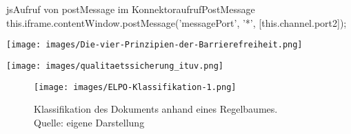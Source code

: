 \begin{table}[!ht]
    \centering
    \caption{Bewertung der Bedrohungen}
    \label{schaden+wahrscheinlichkeitTabelle}
\end{table}



\begin{codeBlock}{js}{Aufruf von postMessage im Konnektor}{aufrufPostMessage}
    this.iframe.contentWindow.postMessage('messagePort', '*', [this.channel.port2]); 
\end{codeBlock}

\begin{center}
\captionsetup{type=figure}
\texttt{[image: images/Die-vier-Prinzipien-der-Barrierefreiheit.png]}
\label{BF-Prinzipien-Bild}
\end{center}

\begin{center}
\captionsetup{type=figure}
\texttt{[image: images/qualitaetssicherung\_ituv.png]}
\label{qualitaetssicherung_ituv}
\end{center}
\begin{figure}
    \centering
    \texttt{[image: images/ELPO-Klassifikation-1.png]}
    \caption{Klassifikation des Dokuments anhand eines Regelbaumes. \protect\\Quelle: eigene Darstellung} %
    \label{fig:ELPO-Klassifikation}
\end{figure}

